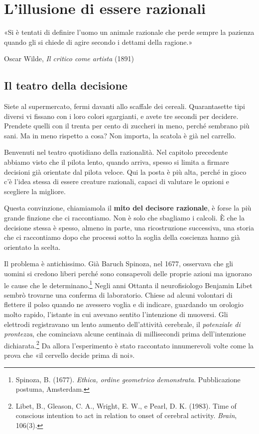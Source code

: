 \chapter{L'illusione di essere razionali}
\label{cap:p1c7}

\epigraph{«Si è tentati di definire l'uomo un animale razionale che perde sempre la pazienza quando gli si chiede di agire secondo i dettami della ragione.»}{Oscar Wilde, \textit{Il critico come artista} (1891)}

\section{Il teatro della decisione}

Siete al supermercato, fermi davanti allo scaffale dei cereali. Quarantasette tipi diversi vi fissano con i loro colori sgargianti, e avete tre secondi per decidere. Prendete quelli con il trenta per cento di zuccheri in meno, perché sembrano più sani. Ma in meno rispetto a cosa? Non importa, la scatola è già nel carrello.

Benvenuti nel teatro quotidiano della razionalità. Nel capitolo precedente abbiamo visto che il pilota lento, quando arriva, spesso si limita a firmare decisioni già orientate dal pilota veloce. Qui la posta è più alta, perché in gioco c'è l'idea stessa di essere creature razionali, capaci di valutare le opzioni e scegliere la migliore.

Questa convinzione, chiamiamola il \textbf{mito del decisore razionale}, è forse la più grande finzione che ci raccontiamo. Non è solo che sbagliamo i calcoli. È che la decisione stessa è spesso, almeno in parte, una ricostruzione successiva, una storia che ci raccontiamo dopo che processi sotto la soglia della coscienza hanno già orientato la scelta.

Il problema è antichissimo. Già Baruch Spinoza, nel 1677, osservava che gli uomini si credono liberi perché sono consapevoli delle proprie azioni ma ignorano le cause che le determinano.\footnote{Spinoza, B. (1677). \textit{Ethica, ordine geometrico demonstrata}. Pubblicazione postuma, Amsterdam.} Negli anni Ottanta il neurofisiologo Benjamin Libet sembrò trovarne una conferma di laboratorio. Chiese ad alcuni volontari di flettere il polso quando ne avessero voglia e di indicare, guardando un orologio molto rapido, l'istante in cui avevano sentito l'intenzione di muoversi. Gli elettrodi registravano un lento aumento dell'attività cerebrale, il \textit{potenziale di prontezza}, che cominciava alcune centinaia di millisecondi prima dell'intenzione dichiarata.\footnote{Libet, B., Gleason, C. A., Wright, E. W., e Pearl, D. K. (1983). Time of conscious intention to act in relation to onset of cerebral activity. \textit{Brain}, 106(3).} Da allora l'esperimento è stato raccontato innumerevoli volte come la prova che «il cervello decide prima di noi».

